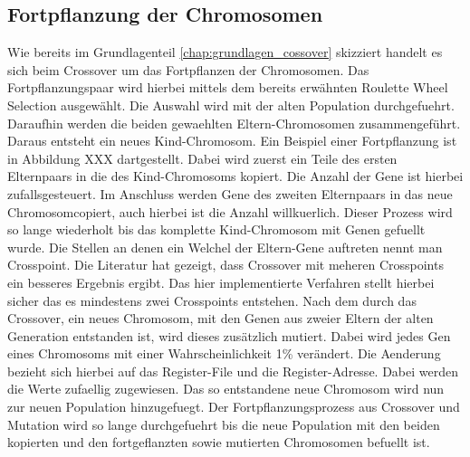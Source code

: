 \subsection{Fortpflanzung der Chromosomen}
Wie bereits im Grundlagenteil \ref{chap:grundlagen_cossover} skizziert handelt es sich beim Crossover um das Fortpflanzen der Chromosomen.
Das Fortpflanzungspaar wird hierbei mittels dem bereits erwähnten Roulette Wheel Selection ausgewählt. Die Auswahl wird mit der alten Population durchgefuehrt.
Daraufhin werden die beiden gewaehlten Eltern-Chromosomen zusammengeführt. Daraus entsteht ein neues Kind-Chromosom. Ein Beispiel einer Fortpflanzung ist in Abbildung XXX dartgestellt. Dabei wird zuerst ein Teile des ersten Elternpaars in die des Kind-Chromosoms kopiert. Die Anzahl der Gene ist hierbei zufallsgesteuert. Im Anschluss werden Gene des zweiten Elternpaars in das neue Chromosomcopiert, auch hierbei ist die Anzahl willkuerlich. Dieser Prozess wird so lange wiederholt bis das komplette Kind-Chromosom mit Genen gefuellt wurde.
Die Stellen an denen ein Welchel der Eltern-Gene auftreten nennt man Crosspoint. Die Literatur hat gezeigt, dass Crossover mit meheren Crosspoints ein besseres Ergebnis ergibt. Das hier implementierte Verfahren stellt hierbei sicher das es mindestens zwei Crosspoints entstehen.
Nach dem durch das Crossover, ein neues Chromosom, mit den Genen aus zweier Eltern der alten Generation entstanden ist, wird dieses zusätzlich mutiert. Dabei wird jedes Gen eines Chromosoms mit einer Wahrscheinlichkeit 1\% verändert. Die Aenderung bezieht sich hierbei auf das Register-File und die Register-Adresse. Dabei werden die Werte zufaellig zugewiesen.
Das so entstandene neue Chromosom wird nun zur neuen Population hinzugefuegt. Der Fortpflanzungsprozess aus Crossover und Mutation wird so lange durchgefuehrt bis die neue Population mit den beiden kopierten und den fortgeflanzten sowie mutierten Chromosomen befuellt ist.  


